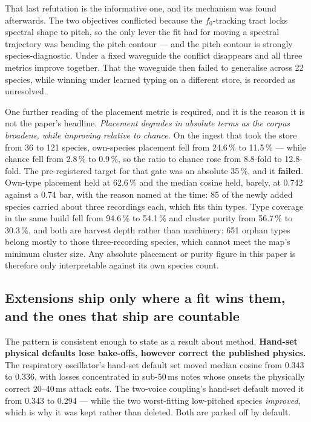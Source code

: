 \documentclass[10pt,twocolumn,a4paper]{article}
\begin{document}
That last refutation is the informative one, and its mechanism was found afterwards. The two
objectives conflicted because the $f_0$-tracking tract locks spectral shape to pitch, so the
only lever the fit had for moving a spectral trajectory was bending the pitch contour --- and
the pitch contour is strongly species-diagnostic. Under a fixed waveguide the conflict
disappears and all three metrics improve together. That the waveguide then failed to
generalise across 22 species, while winning under learned typing on a different store, is
recorded as unresolved.

One further reading of the placement metric is required, and it is the reason it is not the
paper's headline. \emph{Placement degrades in absolute terms as the corpus broadens, while
improving relative to chance.} On the ingest that took the store from 36 to 121 species, own-species
placement fell from 24.6\,\% to 11.5\,\% --- while chance fell from 2.8\,\% to 0.9\,\%, so the
ratio to chance rose from 8.8-fold to 12.8-fold. The pre-registered target for that gate was an
absolute 35\,\%, and it \textbf{failed}. Own-type placement held at 62.6\,\% and the median cosine
held, barely, at 0.742 against a 0.74 bar, with the reason named at the time: 85 of the newly
added species carried about three recordings each, which fits thin types. Type coverage in the
same build fell from 94.6\,\% to 54.1\,\% and cluster purity from 56.7\,\% to 30.3\,\%, and
both are harvest depth rather than machinery: 651 orphan types belong mostly to those
three-recording species, which cannot meet the map's minimum cluster size. Any absolute
placement or purity figure in this paper is therefore only interpretable against its own
species count.

\subsection{Extensions ship only where a fit wins them, and the ones that ship are countable}

The pattern is consistent enough to state as a result about method. \textbf{Hand-set
physical defaults lose bake-offs, however correct the published physics.} The respiratory
oscillator's hand-set default set moved median cosine from 0.343 to 0.336, with losses
concentrated in sub-50\,ms notes whose onsets the physically correct 20--40\,ms attack eats.
The two-voice coupling's hand-set default moved it from 0.343 to 0.294 --- while the two
worst-fitting low-pitched species \emph{improved}, which is why it was kept rather than
deleted. Both are parked off by default.
\end{document}
